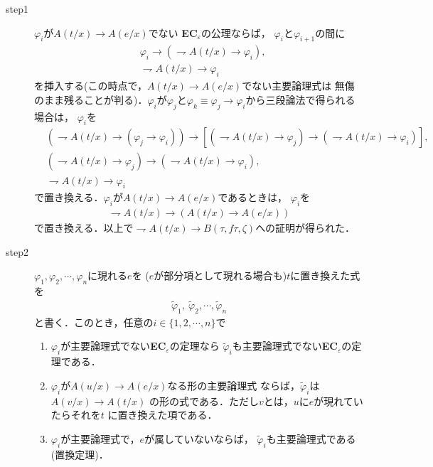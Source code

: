 	\begin{description}
		\item[step1]
			$\varphi_{i}$が$A(t/x) \rightarrow A(e/x)$でない
			{\bf EC}${}_{\varepsilon}$の公理ならば，
			$\varphi_{i}$と$\varphi_{i+1}$の間に
			\begin{align}
				&\varphi_{i} \rightarrow 
				(\rightharpoondown A(t/x) \rightarrow \varphi_{i}), \\
				&\rightharpoondown A(t/x) \rightarrow \varphi_{i}
			\end{align}
			を挿入する(この時点で，$A(t/x) \rightarrow A(e/x)$でない主要論理式は
			無傷のまま残ることが判る)．$\varphi_{i}$が$\varphi_{j}$と$\varphi_{k}
			\equiv \varphi_{j} \rightarrow \varphi_{i}$から三段論法で得られる場合は，
			$\varphi_{i}$を
			\begin{align}
				&(\rightharpoondown A(t/x) \rightarrow (\varphi_{j} \rightarrow \varphi_{i})) \rightarrow
				[(\rightharpoondown A(t/x) \rightarrow \varphi_{j})
				\rightarrow (\rightharpoondown A(t/x) \rightarrow \varphi_{i})], \\
				&(\rightharpoondown A(t/x) \rightarrow \varphi_{j})
				\rightarrow (\rightharpoondown A(t/x) \rightarrow \varphi_{i}), \\
				&\rightharpoondown A(t/x) \rightarrow \varphi_{i}
			\end{align}
			で置き換える．$\varphi_{i}$が$A(t/x) \rightarrow A(e/x)$であるときは，
			$\varphi_{i}$を
			\begin{align}
				\rightharpoondown A(t/x) \rightarrow (A(t/x) \rightarrow A(e/x))
			\end{align}
			で置き換える．以上で$\rightharpoondown A(t/x) \rightarrow 
			B(\tau,f\tau,\zeta)$への証明が得られた．
	
		\item[step2]
			$\varphi_{1},\varphi_{2},\cdots,\varphi_{n}$に現れる$e$を
			($e$が部分項として現れる場合も)$t$に置き換えた式を
			\begin{align}
				\tilde{\varphi}_{1},\ \tilde{\varphi}_{2},\cdots, \tilde{\varphi}_{n}
			\end{align}
			と書く．このとき，任意の$i \in \{1,2,\cdots,n\}$で
			\begin{enumerate}
				\item $\varphi_{i}$が主要論理式でない{\bf EC}${}_{\varepsilon}$の定理なら
					$\tilde{\varphi}_{i}$も主要論理式でない{\bf EC}${}_{\varepsilon}$の定理である．
				\item $\varphi_{i}$が$A(u/x) \rightarrow A(e/x)$なる形の主要論理式
					ならば，$\tilde{\varphi}_{i}$は$A(v/x) \rightarrow A(t/x)$
					の形の式である．ただし$v$とは，$u$に$e$が現れていたらそれを$t$
					に置き換えた項である．
				\item $\varphi_{i}$が主要論理式で，$e$が属していないならば，
					$\tilde{\varphi}_{i}$も主要論理式である(置換定理)．
			\end{enumerate}
	

\end{description}
